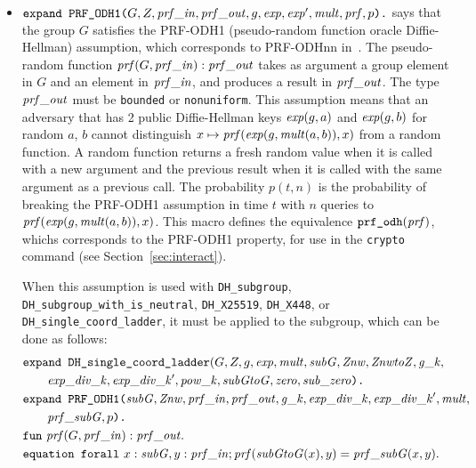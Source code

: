 \documentclass{article}
\begin{document}
\begin{itemize}
\begin{itemize}
\begin{itemize}
     \item $\texttt{expand\ PRF\_ODH1(}G, Z, \mathit{prf\_in}, \mathit{prf\_out}, g, \mathit{exp}, \mathit{exp}', \mathit{mult}, \mathit{prf}, p\texttt{).}$ says that the group $G$ satisfies the PRF-ODH1 (pseudo-random function oracle Diffie-Hellman) assumption, which corresponds to PRF-ODHnn in~\cite{eprint2017:517}.
       The pseudo-random function $\mathit{prf}(G, \mathit{prf\_in}): \mathit{prf\_out}$ takes as argument a group element in $G$ and an element in $\mathit{prf\_in}$, and produces a result in $\mathit{prf\_out}$. The type $\mathit{prf\_out}$ must be \texttt{bounded} or \texttt{nonuniform}.
   This assumption means that an adversary that has 2 public Diffie-Hellman keys $\mathit{exp}(g,a)$ and $\mathit{exp}(g,b)$ for random $a$, $b$ cannot distinguish $x \mapsto \mathit{prf}(\mathit{exp}(g,\mathit{mult}(a,b)),x)$ from a random function. A random function returns a fresh random value when it is called with a new argument and the previous result when it is called with the same argument as a previous call. The probability $p(t, n)$ is the probability of breaking the PRF-ODH1 assumption
   in time $t$ with $n$ queries to $\mathit{prf}(\mathit{exp}(g,\mathit{mult}(a,b)),x)$.
This macro defines the equivalence
       $\texttt{prf\_odh}(\mathit{prf})$, whichs corresponds to the PRF-ODH1 property, for use in the \texttt{crypto} command (see
       Section~\ref{sec:interact}).

When this assumption is used with \texttt{DH\_subgroup}, \texttt{DH\_subgroup\_with\_is\_neutral}, \texttt{DH\_X25519},
\texttt{DH\_X448}, or \texttt{DH\_single\_coord\_ladder}, it
must be applied to the subgroup, which can be done as follows:
\begin{align*}
  &\texttt{expand\ DH\_single\_coord\_ladder}(G, Z, g, \mathit{exp}, \mathit{mult}, \mathit{subG}, \mathit{Znw}, \mathit{ZnwtoZ}, \mathit{g\_k},\\
  &\qquad\mathit{exp\_div\_k}, \mathit{exp\_div\_k}', \mathit{pow\_k}, \mathit{subGtoG}, \mathit{zero}, \mathit{sub\_zero}\texttt{).}\\
  &\texttt{expand\ PRF\_ODH1(}\mathit{subG}, \mathit{Znw}, \mathit{prf\_in}, \mathit{prf\_out},
  \mathit{g\_k}, \mathit{exp\_div\_k}, \mathit{exp\_div\_k}', \mathit{mult},\\
  &\qquad\mathit{prf\_subG}, p\texttt{).}\\
  &\texttt{fun}\ \mathit{prf}(G, \mathit{prf\_in}): \mathit{prf\_out}.\\
  &\texttt{equation\ forall}\ x:\mathit{subG}, y:\mathit{prf\_in}; \mathit{prf}(\mathit{subGtoG}(x),y) = \mathit{prf\_subG}(x,y).
\end{align*}


\end{itemize}
\end{itemize}
\end{itemize}
\end{document}
